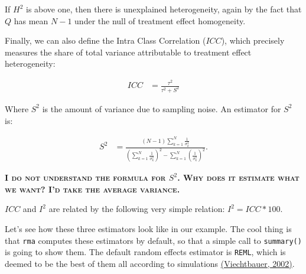 \documentclass[]{book}
\theoremstyle{definition}
\theoremstyle{definition}
\theoremstyle{definition}
\theoremstyle{remark}
\let\BeginKnitrBlock\begin \let\EndKnitrBlock\end
\begin{document}
If \(H^2\) is above one, then there is unexplained heterogeneity, again by the fact that \(Q\) has mean \(N-1\) under the null of treatment effect homogeneity.

Finally, we can also define the Intra Class Correlation (\(ICC\)), which precisely measures the share of total variance attributable to treatment effect heterogeneity:

\begin{align*}
  ICC & = \frac{\tau^2}{\tau^2+S^2}
\end{align*}

Where \(S^2\) is the amount of variance due to sampling noise.
An estimator for \(S^2\) is:

\begin{align*}
  S^2 & = \frac{(N-1)\sum_{k=1}^N\frac{1}{\sigma^2_k}}{(\sum_{k=1}^N\frac{1}{\sigma^2_k})^2-\sum_{k=1}^N(\frac{1}{\sigma^2_k})^2}.
\end{align*}

\textbf{\textsc{I do not understand the formula for \(S^2\). Why does it estimate what we want? I'd take the average variance.}}

\(ICC\) and \(I^2\) are related by the following very simple relation: \(I^2=ICC*100\).

\BeginKnitrBlock{example}
\protect\hypertarget{exm:unnamed-chunk-152}{}{\label{exm:unnamed-chunk-152} }Let's see how these three estimators look like in our example.
The cool thing is that \texttt{rma} computes these estimators by default, so that a simple call to \texttt{summary()} is going to show them.
The default random effects estimator is \texttt{REML}, which is deemed to be the best of them all according to simulations \href{https://journals.sagepub.com/doi/abs/10.3102/10769986030003261}{(Viechtbauer, 2002)}.
\EndKnitrBlock{example}
\end{document}
